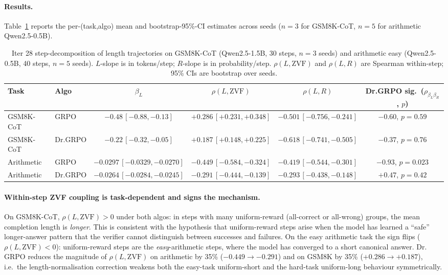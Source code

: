 \documentclass{article}
\begin{document}
\paragraph{Results.}
Table~\ref{tab:length-bias-iter28} reports the per-(task,algo) mean and
bootstrap-95\%-CI estimates across seeds ($n{=}3$ for GSM8K-CoT,
$n{=}5$ for arithmetic Qwen2.5-0.5B).

\begin{table}[htbp]
\centering
\small
\caption{Iter 28 step-decomposition of length trajectories on GSM8K-CoT
(Qwen2.5-1.5B, 30 steps, $n{=}3$ seeds) and arithmetic easy
(Qwen2.5-0.5B, 40 steps, $n{=}5$ seeds). $L$-slope is in tokens/step;
$R$-slope is in probability/step. $\rho(L,\mathrm{ZVF})$ and $\rho(L,R)$
are Spearman within-step; 95\% CIs are bootstrap over seeds.
\label{tab:length-bias-iter28}}
\begin{tabular}{llcccc}
\hline
Task & Algo & $\beta_L$ & $\rho(L,\mathrm{ZVF})$ & $\rho(L,R)$ & Dr.GRPO sig.\ ($\rho_{\beta_L\beta_R}$, $p$) \\
\hline
GSM8K-CoT & GRPO & $-0.48\,[-0.88,-0.13]$ & $+0.286\,[+0.231,+0.348]$ & $-0.501\,[-0.756,-0.241]$ & $-0.60$, $p{=}0.59$ \\
GSM8K-CoT & Dr.GRPO & $-0.22\,[-0.32,-0.05]$ & $+0.187\,[+0.148,+0.225]$ & $-0.618\,[-0.741,-0.505]$ & $-0.37$, $p{=}0.76$ \\
Arithmetic & GRPO & $-0.0297\,[-0.0329,-0.0270]$ & $-0.449\,[-0.584,-0.324]$ & $-0.419\,[-0.544,-0.301]$ & $\mathbf{-0.93}$, $p{=}0.023$ \\
Arithmetic & Dr.GRPO & $-0.0264\,[-0.0284,-0.0245]$ & $-0.291\,[-0.444,-0.139]$ & $-0.293\,[-0.438,-0.148]$ & $+0.47$, $p{=}0.42$ \\
\hline
\end{tabular}
\end{table}

\paragraph{Within-step ZVF coupling is task-dependent and signs the
mechanism.}
On GSM8K-CoT, $\rho(L, \mathrm{ZVF}) > 0$ under both algos: in steps with
many uniform-reward (all-correct or all-wrong) groups, the mean
completion length is \emph{longer}. This is consistent with the
hypothesis that uniform-reward steps arise when the model has learned a
``safe'' longer-answer pattern that the verifier cannot distinguish
between successes and failures. On the easy arithmetic task the sign
flips ($\rho(L, \mathrm{ZVF}) < 0$): uniform-reward steps are the
\emph{easy}-arithmetic steps, where the model has converged to a short
canonical answer. Dr.\,GRPO reduces the magnitude of $\rho(L, \mathrm{ZVF})$
on arithmetic by 35\% ($-0.449 \to -0.291$) and on GSM8K by 35\%
($+0.286 \to +0.187$), i.e.\ the length-normalisation correction
weakens both the easy-task uniform-short and the hard-task uniform-long
behaviour symmetrically.
\end{document}
